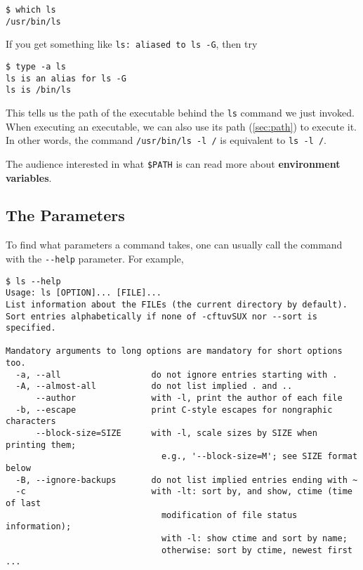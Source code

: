 \documentclass[12pt,letterpaper]{article}
\begin{document}
\begin{verbatim}
$ which ls
/usr/bin/ls
\end{verbatim}

If you get something like \texttt{ls: aliased to ls -G}, then try

\begin{verbatim}
$ type -a ls
ls is an alias for ls -G
ls is /bin/ls
\end{verbatim}

This tells us the path of the executable behind the \texttt{ls} command we just invoked. When executing an executable, we can also use its path (\cref*{sec:path}) to execute it. In other words, the command \texttt{/usr/bin/ls -l /} is equivalent to \texttt{ls -l /}.

The audience interested in what \texttt{\$PATH} is can read more about \textbf{environment variables}.

\subsection{The Parameters} \label{sec:parameters}

To find what parameters a command takes, one can usually call the command with the \texttt{-{}-help} parameter. For example,

\begin{verbatim}
$ ls --help
Usage: ls [OPTION]... [FILE]...
List information about the FILEs (the current directory by default).
Sort entries alphabetically if none of -cftuvSUX nor --sort is specified.

Mandatory arguments to long options are mandatory for short options too.
  -a, --all                  do not ignore entries starting with .
  -A, --almost-all           do not list implied . and ..
      --author               with -l, print the author of each file
  -b, --escape               print C-style escapes for nongraphic characters
      --block-size=SIZE      with -l, scale sizes by SIZE when printing them;
                               e.g., '--block-size=M'; see SIZE format below
  -B, --ignore-backups       do not list implied entries ending with ~
  -c                         with -lt: sort by, and show, ctime (time of last
                               modification of file status information);
                               with -l: show ctime and sort by name;
                               otherwise: sort by ctime, newest first
...
\end{verbatim}
\end{document}

